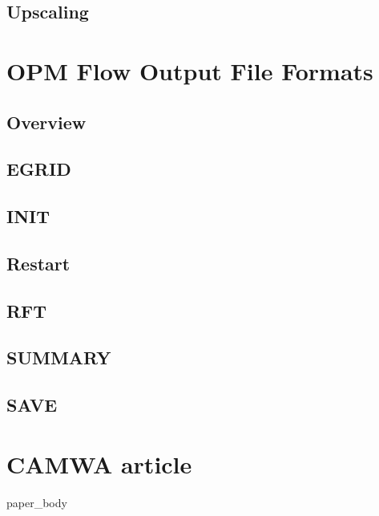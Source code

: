 \documentclass{elsarticle}
\begin{document}
\subsection{Upscaling}

\begin{appendices}

\section{OPM Flow Output File Formats}
\subsection{Overview}
\subsection{EGRID}
\subsection{INIT}
\subsection{Restart}
\subsection{RFT}
\subsection{SUMMARY}
\subsection{SAVE}

\section{CAMWA article}
{paper_body}
\end{appendices}
\end{document}
